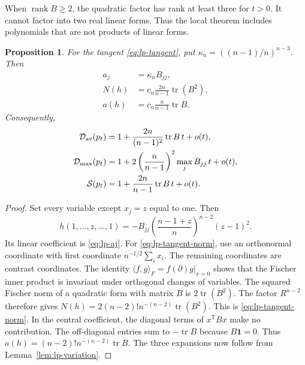 \documentclass[11pt,a4paper]{article}
\newtheorem{proposition}[theorem]{Proposition}
\theoremstyle{definition}
\theoremstyle{remark}
\newcommand{\T}{\mathsf{T}}
\begin{document}
When $\operatorname{rank}B\ge2$, the quadratic factor has rank at least three for $t>0$.
It cannot factor into two real linear forms.
Thus the local theorem includes polynomials that are not products of linear forms.

\begin{proposition}\label{prop:lp-stable-variations}
For the tangent \eqref{eq:lp-tangent}, put $\kappa_n=((n-1)/n)^{n-3}$.
Then
\begin{align}
 a_j&=\kappa_nB_{jj},\label{eq:lp-aj}\\
 N(h)&=c_n\frac{2n}{n-1}\operatorname{tr}(B^2),\label{eq:lp-tangent-norm}\\
 a(h)&=c_n\frac{n}{n-1}\operatorname{tr}B.\label{eq:lp-tangent-central}
\end{align}
Consequently,
\begin{align}
 \mathcal D_{\rm av}(p_t)&=1+\frac{2n}{(n-1)^2}\operatorname{tr}B\,t+o(t),\label{eq:lp-first-deletion}\\
 \mathcal D_{\max}(p_t)&=1+2\left(\frac n{n-1}\right)^2\max_jB_{jj}\,t+o(t),\label{eq:lp-first-maximum}\\
 \mathcal S(p_t)&=1+\frac{2n}{n-1}\operatorname{tr}B\,t+o(t).\label{eq:lp-first-strong}
\end{align}
\end{proposition}
\begin{proof}
Set every variable except $x_j=z$ equal to one.
Then
\[
 h(1,\ldots,z,\ldots,1)
 =-B_{jj}\left(\frac{n-1+z}{n}\right)^{n-2}(z-1)^2.
\]
Its linear coefficient is \eqref{eq:lp-aj}.
For \eqref{eq:lp-tangent-norm}, use an orthonormal coordinate with first coordinate $n^{-1/2}\sum_i x_i$.
The remaining coordinates are contrast coordinates.
The identity $\langle f,g\rangle_F=f(\partial)g|_{x=0}$ shows that the Fischer inner product is invariant under orthogonal changes of variables.
The squared Fischer norm of a quadratic form with matrix $B$ is $2\operatorname{tr}(B^2)$.
The factor $R^{n-2}$ therefore gives
$N(h)=2(n-2)!n^{-(n-2)}\operatorname{tr}(B^2)$.
This is \eqref{eq:lp-tangent-norm}.
In the central coefficient, the diagonal terms of $x^\T Bx$ make no contribution.
The off-diagonal entries sum to $-\operatorname{tr}B$ because $B\mathbf1=0$.
Thus $a(h)=(n-2)!n^{-(n-2)}\operatorname{tr}B$.
The three expansions now follow from Lemma~\ref{lem:lp-variation}.
\end{proof}
\end{document}
